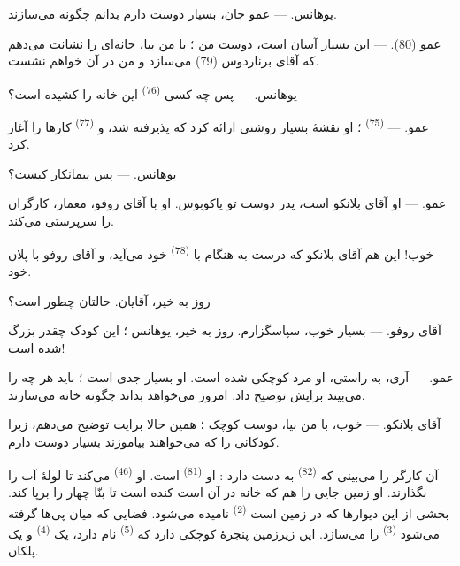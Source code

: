 \VUsaut{6.0mm}
\VUsaut{1.4mm}
\VUsaut{2.2mm}

\VUsaut{3.0mm}

\textsc{یوهانس}. --- عمو جان، بسیار دوست دارم بدانم چگونه 
می‌سازند.

\textsc{عمو} (80). --- این بسیار آسان است، دوست من ؛ با من بیا، خانه‌ای
را نشانت می‌دهم که آقای برناردوس (79) می‌سازد و من در آن خواهم نشست.

\textsc{یوهانس}. --- پس چه کسی  \textsuperscript{(76)} این
خانه را کشیده است؟

\textsc{عمو}. ---  \textsuperscript{(75)} ؛ او نقشهٔ بسیار
روشنی ارائه کرد که پذیرفته شد، و  \textsuperscript{(77)}
کارها را آغاز کرد.

\textsc{یوهانس}. --- پس پیمانکار کیست؟

\textsc{عمو}. --- او آقای بلانکو است، پدر دوست تو یاکوبوس. او با آقای
روفو، معمار، کارگران را سرپرستی می‌کند.

خوب! این هم آقای بلانکو که درست به هنگام با 
\textsuperscript{(78)} خود می‌آید، و آقای روفو با پلان خود.

روز به خیر، آقایان. حالتان چطور است؟

\textsc{آقای روفو}. --- بسیار خوب، سپاسگزارم. روز به خیر، یوهانس ؛ این
کودک چقدر بزرگ شده است!

\textsc{عمو}. --- آری، به راستی، او مرد کوچکی شده است. او بسیار جدی
است ؛ باید هر چه را می‌بیند برایش توضیح داد. امروز می‌خواهد بداند
چگونه خانه می‌سازند.

\VUsaut{3.0mm}

\textsc{آقای بلانکو}. --- خوب، با من بیا، دوست کوچک ؛ همین حالا برایت
توضیح می‌دهم، زیرا کودکانی را که می‌خواهند بیاموزند بسیار دوست دارم.

آن کارگر را می‌بینی که  \textsuperscript{(82)} به دست دارد :
او  \textsuperscript{(81)} است. او
 \textsuperscript{(46)} می‌کند تا لولهٔ آب را بگذارند. او
زمین جایی را هم که خانه در آن است کنده است تا بنّا چهار 
را برپا کند. بخشی از این دیوارها که در زمین است 
\textsuperscript{(2)} نامیده می‌شود. فضایی که میان پی‌ها گرفته می‌شود
 \textsuperscript{(3)} را می‌سازد. این زیرزمین پنجرهٔ
کوچکی دارد که  \textsuperscript{(5)} نام دارد،
یک  \textsuperscript{(4)} و یک پلکان.

